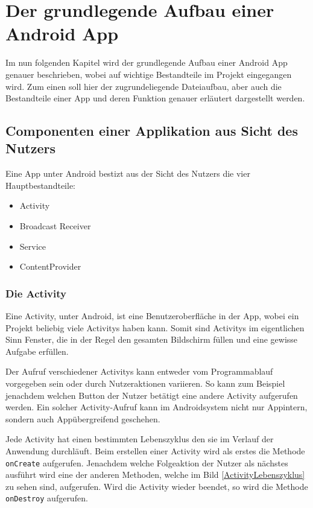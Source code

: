 \section{Der grundlegende Aufbau einer Android App}
Im nun folgenden Kapitel wird der grundlegende Aufbau einer Android App genauer beschrieben, wobei auf wichtige Bestandteile im Projekt eingegangen wird.
Zum einen soll hier der zugrundeliegende Dateiaufbau, aber auch die Bestandteile einer App und deren Funktion genauer erl\"autert dargestellt werden. \cite{Android44}

\subsection{Componenten einer Applikation aus Sicht des Nutzers}
Eine App unter Android bestizt aus der Sicht des Nutzers die vier Hauptbestandteile:
\begin{itemize}
 \item Activity
 \item Broadcast Receiver
 \item Service
 \item ContentProvider
\end{itemize}

\subsubsection{Die Activity} \label{Die Activity aus Nutzersicht}
Eine Activity, unter Android, ist eine Benutzeroberfl\"ache in der App, wobei ein Projekt beliebig viele Activitys haben kann. Somit sind Activitys im eigentlichen Sinn Fenster, die in der Regel den gesamten Bildschirm f\"ullen und eine gewisse Aufgabe erf\"ullen. \cite{Kuehn12}

Der Aufruf verschiedener Activitys kann entweder vom Programmablauf vorgegeben sein oder durch Nutzeraktionen variieren. So kann zum Beispiel jenachdem welchen Button der Nutzer bet\"atigt eine andere Activity aufgerufen werden. Ein solcher Activity-Aufruf kann im Androidsystem nicht nur Appintern, sondern auch App\"ubergreifend geschehen. \cite{Android44}

Jede Activity hat einen bestimmten Lebenszyklus den sie im Verlauf der Anwendung durchl\"auft. Beim erstellen einer Activity wird als erstes die Methode \texttt{onCreate} aufgerufen. Jenachdem welche Folgeaktion der Nutzer als n\"achstes ausf\"uhrt wird eine der anderen Methoden, welche im Bild \ref{ActivityLebenszyklus} zu sehen sind, aufgerufen. Wird die Activity wieder beendet, so wird die Methode \texttt{onDestroy} aufgerufen. 

